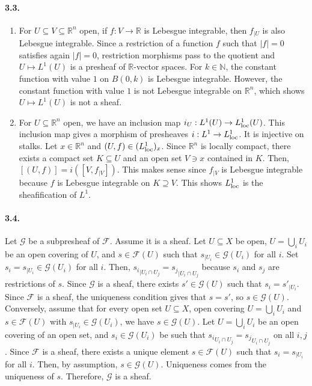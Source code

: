 \documentclass{article}
\newcommand{\N}{\mathbb{N}}
\newcommand{\R}{\mathbb{R}}
\newcommand{\F}{\mathcal{F}}
\newcommand{\G}{\mathcal{G}}
\begin{document}
\paragraph{3.3.} \begin{enumerate}
    \item For $U \subseteq V \subseteq \R^n$ open, if $f : V \to \R$ is Lebesgue integrable, then $f_{\mid U}$ is also Lebesgue integrable. Since a restriction of a function $f$ such that $|f| = 0$ satisfies again $|f| = 0$, restriction morphisms pass to the quotient and $U \mapsto L^1 (U)$ is a presheaf of $\R$-vector spaces. For $k \in \N$, the constant function with value $1$ on $B(0,k)$ is Lebesgue integrable. However, the constant function with value $1$ is not Lebesgue integrable on $\R^n$, which shows $U \mapsto L^1(U)$ is not a sheaf.
    \item For $U \subseteq \R^n$ open, we have an inclusion map $i_U : L^1(U) \to L^1_{\rm loc} (U)$. This inclusion map gives a morphism of presheaves $i : L^1 \to L^1_{\rm loc}$. It is injective on stalks. Let $x \in \R^n$ and $(U, f) \in (L^1_{\rm loc})_x$. Since $\R^n$ is locally compact, there exists a compact set $K \subseteq U$ and an open set $V \ni x$ contained in $K$. Then, $[(U,f)] = i([V,f_{\mid V}])$. This makes sense since $f_{\mid V}$ is Lebesgue integrable because $f$ is Lebesgue integrable on $K \supseteq V$. This shows $L^1_{\rm loc}$ is the sheafification of $L^1$.
\end{enumerate}

\paragraph{3.4.} Let $\G$ be a subpresheaf of $\F$. Assume it is a sheaf. Let $U \subseteq X$ be open, $U = \bigcup_i U_i$ be an open covering of $U$, and $s \in \F(U)$ such that $s_{\mid U_i} \in \G(U_i)$ for all $i$. Set $s_i = s_{\mid U_i} \in \G(U_i)$ for all $i$. Then, ${s_i}_{\mid U_i \cap U_j} = {s_j}_{\mid U_i \cap U_j}$ because $s_i$ and $s_j$ are restrictions of $s$. Since $\G$ is a sheaf, there exists $s' \in \G(U)$ such that $s_i = s'_{\mid U_i}$. Since $\F$ is a sheaf, the uniqueness condition gives that $s = s'$, so $s\in \G(U)$. Conversely, assume that for every open set $U \subseteq X$, open covering $U = \bigcup_i U_i$ and $s \in \F(U)$ with $s_{\mid U_i} \in \G(U_i)$, we have $s \in \G(U)$. Let $U = \bigcup_i U_i$ be an open covering of an open set, and $s_i \in \G(U_i)$ be such that ${s_i}_{U_i \cap U_j} = {s_j}_{U_i \cap U_j}$ on all $i,j$. Since $\F$ is a sheaf, there exists a unique element $s \in \F(U)$ such that $s_i = s_{\mid U_i}$ for all $i$. Then, by assumption, $s \in \G(U)$. Uniqueness comes from the uniqueness of $s$. Therefore, $\G$ is a sheaf.
\end{document}
